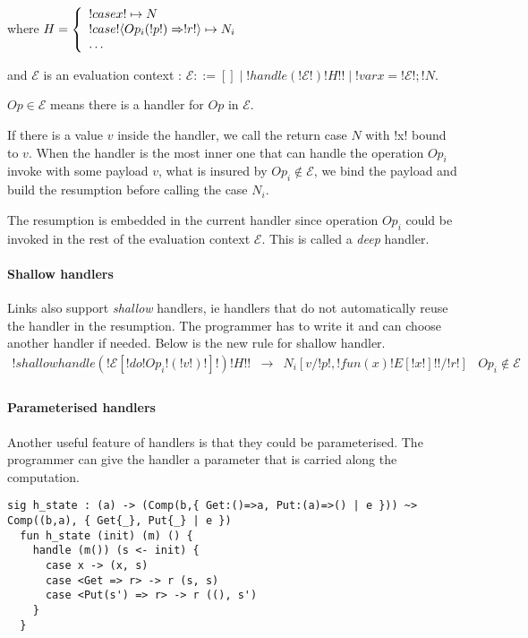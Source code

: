 \documentclass[11pt, nonacm=true, language=french, language=english]{acmart}
\begin{document}
where $H =
\left\{\begin{array}{l}
  !case x! \mapsto N \\
  !case ! \langle Op_{i}(!p!) \Rightarrow !r!\rangle \mapsto N_{i} \\
  \dots \\
\end{array}\right.$

and $\mathcal E$ is an evaluation context : $\mathcal E ::= [] \mid !handle ( !\mathcal E! ) { !H! } ! \mid !var x = ! \mathcal E ! ; ! N$.

$Op \in \mathcal E$ means there is a handler for $Op$ in $\mathcal E$.

If there is a value $v$ inside the handler, we call the return case $N$ with !x! bound to $v$. When the handler is the most inner one that can handle the operation $Op_{i}$ invoke with some payload $v$, what is insured by $Op_{i}\notin \mathcal E$, we bind the payload and build the resumption before calling the case $N_{i}$.

The resumption is embedded in the current handler since operation $Op_{i}$ could be invoked in the rest of the evaluation context $\mathcal E$. This is called a \emph{deep} handler.

\paragraph{Shallow handlers}
Links also support \emph{shallow} handlers, ie handlers that do not automatically reuse the handler in the resumption. The programmer has to write it and can choose another handler if needed. Below is the new rule for shallow handler.
\[
  \begin{array}{rcll}
    !shallowhandle ( !\mathcal E[!do !Op_{i}!( !v! )!]! ) { !H! }! & \longrightarrow & N_{i}[v/!p!, !fun (x)  { ! E[!x!] ! }!/!r!] & Op_{i} \notin \mathcal E\\
  \end{array}
\]

\paragraph{Parameterised handlers}

Another useful feature of handlers is that they could be parameterised. The programmer can give the handler a parameter that is carried along the computation.

\begin{lstlisting}[caption=Example of parameterised handler]
  sig h_state : (a) -> (Comp(b,{ Get:()=>a, Put:(a)=>() | e })) ~> Comp((b,a), { Get{_}, Put{_} | e })
  fun h_state (init) (m) () {
    handle (m()) (s <- init) {
      case x -> (x, s)
      case <Get => r> -> r (s, s)
      case <Put(s') => r> -> r ((), s')
    }
  }
\end{lstlisting}
\end{document}
